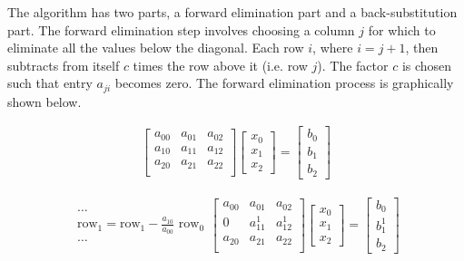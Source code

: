 \documentclass[10pt,letterpaper,notitlepage]{article}
\newcommand{\beq}{\begin{equation*} \begin{aligned}}
\newcommand{\eeq}{\end{aligned}\end{equation*}}
\begin{document}
\noindent
The algorithm has two parts, a forward elimination part and a back-substitution part. The forward elimination step involves choosing a column $j$ for which to eliminate all the values below the diagonal. Each row $i$, where $i=j+1$, then subtracts from itself $c$ times the row above it (i.e. row $j$). The factor $c$ is chosen such that entry $a_{ji}$ becomes zero. The forward elimination process is graphically shown below.

\beq
\begin{bmatrix}
	a_{00} & a_{01} & a_{02} \\
	a_{10} & a_{11} & a_{12} \\
	a_{20} & a_{21} & a_{22} \\
\end{bmatrix}
\begin{bmatrix}
	x_0 \\ x_1 \\ x_2
\end{bmatrix}
=
\begin{bmatrix}
	b_0 \\ b_1 \\ b_2
\end{bmatrix}
\eeq 

\beq
\begin{matrix}
	\dots\\
	\text{row}_1 = \text{row}_1 - \frac{a_{10}}{a_{00}} \text{ row}_0\\
	\dots
\end{matrix}
\begin{bmatrix}
	a_{00} & a_{01} & a_{02} \\
	0    & a_{11}^1 & a_{12}^1 \\
	a_{20} & a_{21} & a_{22} \\
\end{bmatrix}
\begin{bmatrix}
	x_0 \\ x_1 \\ x_2
\end{bmatrix}
=
\begin{bmatrix}
	b_0 \\ b_1^1 \\ b_2
\end{bmatrix}
\eeq  
\end{document}
